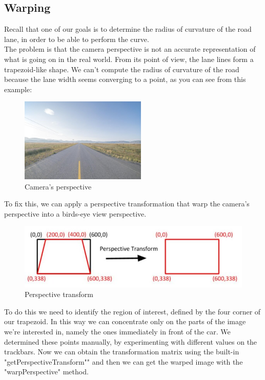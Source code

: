 \documentclass[12pt,a4paper]{article}
\begin{document}
\begin{large}
\begin{figure} [!htb]
\begin{subfigure}[b]{0.4\textwidth}
    \end{subfigure}
  \end{figure}

\subsection{Warping}
Recall that one of our goals is to determine the radius of curvature of the road lane, in order to be able to perform the curve. \\
The problem is that the camera perspective is not an accurate representation of what is going on in the real world. From its point of view, the lane lines form a trapezoid-like shape. We can't compute the radius of curvature of the road because the lane width seems converging to a point, as you can see from this example:\\

\begin{figure} [h!]
\centering
\captionsetup{justification=centering}
\includegraphics[width=6cm]{images/road_endless_straight_vanishing.jpg}
\caption{Camera's perspective}
\end{figure}

To fix this, we can apply a perspective transformation that warp the camera's perspective into a birds-eye view perspective.

\begin{figure} [h!]
  \centering
  \captionsetup{justification=centering}
  \includegraphics{images/perspective_transform.jpg}
  \caption{Perspective transform}
  \end{figure}

To do this we need to identify the region of interest, defined by the four corner of our trapezoid. In this way we can concentrate only on the parts of the image we're interested in, namely the ones immediately in front of the car. We determined these points manually, by experimenting with different values on the trackbars. Now we can obtain the transformation matrix using the built-in "getPerspectiveTransform"" and then we can get the warped image with the "warpPerspective" method.


\end{large}
\end{document}
